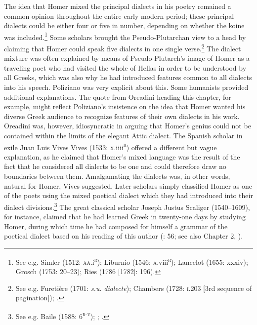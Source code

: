 The idea that Homer mixed the principal dialects in his poetry remained a common opinion throughout the entire early modern period; these principal dialects could be either four or five in number, depending on whether the koine was included.\footnote{See e.g. Simler (1512: \textsc{aa.}i\textsc{\textsuperscript{r}}); Liburnio (1546: \textsc{a}.viii\textsc{\textsuperscript{r}}); Lancelot (1655: xxxiv); Grosch (1753: 20–23); Ries (1786 [1782]: 196).} Some scholars brought the Pseudo-Plutarchan view to a head by claiming that Homer could speak five dialects in one single verse.\footnote{See e.g. Furetière (1701: \textit{s.u.} \textit{dialecte}); Chambers (1728: \textsc{i.}203 [3rd sequence of pagination]); \citet[934]{Dumarsais1754}.} The dialect mixture was often explained by means of Pseudo-Plutarch’s image of Homer as a traveling poet who had visited the whole of Hellas in order to be understood by all Greeks, which was also why he had introduced features common to all dialects into his speech. Poliziano was very explicit about this. Some humanists provided additional explanations. The quote from Oreadini heading this chapter, for example, might reflect Poliziano’s insistence on the idea that Homer wanted his diverse Greek audience to recognize features of their own dialects in his work. Oreadini was, however, idiosyncratic in arguing that Homer’s genius could not be contained within the limits of the elegant Attic dialect. The Spanish scholar in exile Juan Luis Vives Vives (1533: \textsc{x}.iiii\textsc{\textsuperscript{r}}) offered a different but vague explanation, as he claimed that Homer’s mixed language was the result of the fact that he considered all dialects to be one and could therefore draw no boundaries between them. Amalgamating the dialects was, in other words, natural for Homer, Vives suggested. Later scholars simply classified Homer as one of the poets using the mixed poetical dialect which they had introduced into their dialect divisions.\footnote{See e.g. Baile (1588: 6\textsc{\textsuperscript{r-v}}); \citet[333]{Alsted1630}; \citet[161]{Gesner1774}.} The great classical scholar Joseph Justus Scaliger (1540–1609), for instance, claimed that he had learned Greek in twenty-one days by studying Homer, during which time he had composed for himself a grammar of the poetical dialect based on his reading of this author (\citealt{Scaliger1594}: 56; see also Chapter 2, ).

